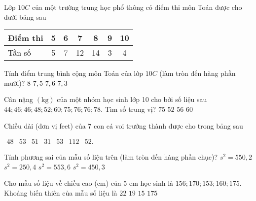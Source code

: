 \begin{ex}%
	Lớp $ 10C $ của một trường trung học phổ thông có điểm thi môn Toán được cho dưới bảng sau
	\begin{center}
		
	\begin{tabular}{|l|c|c|c|c|c|c|}
		\hline Điểm thi & 5 & 6 & 7 & 8 & 9 & 10 \\
		\hline Tần số & 5 & 7 & 12 & 14 & 3 & 4 \\
		\hline
	\end{tabular}

\end{center}
	Tính điểm trung bình cộng môn Toán của lớp $10C$ (làm tròn đến hàng phần mười)?
	\choice
	{$ 8  $}
	{$ 7,5 $ }
	{$ 7,6  $}
	{\True $ 7,3  $}
\end{ex}

\begin{ex}%
	Cân nặng $(\mathrm{kg})$ của một nhóm học sinh lớp 10 cho bởi số liệu sau \linebreak 
$44; 46; 46;	48;	52; 60; 75; 76; 76; 78$.
	Tìm số trung vị? 
	\choice
	{$ 75 $ }
	{$ 52  $}
	{\True $ 56 $ }
	{$ 60  $}
\end{ex}

\begin{ex}%
	Chiều dài (đơn vị feet) của 7 con cá voi trưởng thành được cho trong bảng sau
	\begin{center} $\begin{array}{lllllll}48 & 53 & 51 & 31 & 53 & 112 & 52 .\end{array}$
		\end{center}
	Tính phương sai của mẫu số liệu trên (làm tròn đến hàng phần chục)? 
	\choice
	{$s^2=550,2$}
	{$s^2=250,4$}
	{$s^2=553,6$}
	{$s^2=450,3$}
\end{ex}

\begin{ex}%
	Cho mẫu số liệu về chiều cao (cm) của 5 em học sinh là $156 ; 170 ; 153 ; 160 ; 175$. Khoảng biến thiên của mẫu số liệu là 
	\choice
	{\True $ 22  $}
	{$ 19  $}
	{$ 15  $}
	{$ 175 $}
\end{ex}


